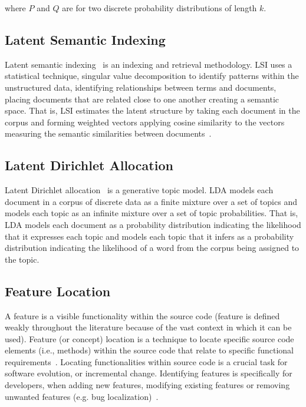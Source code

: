 where $P$ and $Q$ are for two discrete probability distributions of length $k$.

\subsection{Latent Semantic Indexing}

Latent semantic indexing~\cite{Deerwester-etal:1990} is an indexing and
retrieval methodology. LSI uses a statistical technique, singular value
decomposition to identify patterns within the unstructured data, identifying relationships 
between terms and documents, placing documents that are related close to one another 
creating a semantic space. That is, LSI estimates the latent structure by taking each 
document in the corpus and forming weighted vectors applying cosine similarity to the vectors 
measuring the semantic similarities between documents~\cite{Binkley-Lawrie:2010}.

\subsection{Latent Dirichlet Allocation}

Latent Dirichlet allocation~\cite{Blei-etal:2003} is a generative topic model.
LDA models each document in a corpus of discrete data as a finite mixture over
a set of topics and models each topic as an infinite mixture over a set of
topic probabilities.  That is, LDA models each document as a probability
distribution indicating the likelihood that it expresses each topic and models
each topic that it infers as a probability distribution indicating the
likelihood of a word from the corpus being assigned to the topic.


\subsection{Feature Location} 

A feature is a visible functionality within the source code (feature is
defined weakly throughout the literature because of the vast context in which
it can be used). Feature (or concept) location is a technique to locate
specific source code elements (i.e., methods) within the source code that
relate to specific functional requirements~\cite{972777}.  Locating
functionalities within source code is a crucial task for software evolution, or
incremental change. Identifying features is specifically  for developers, when
adding new features, modifying existing features or removing unwanted features
(e.g.  bug localization)~\cite{4656405,1309648}.  

